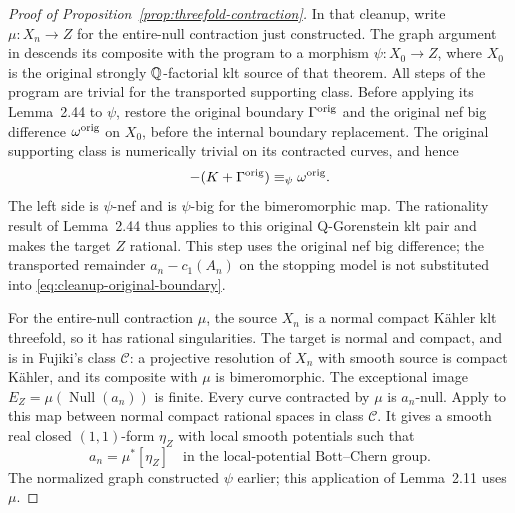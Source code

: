 \begin{proof}[Proof of Proposition~\ref{prop:threefold-contraction}]
In that cleanup, write \(\mu:X_n\to Z\) for the entire-null contraction
just constructed.  The graph argument in
\cite[proof of Theorem~6.4, pp.~51--52]{DasHacon2024} descends its
composite with the program to a morphism \(\psi:X_0\to Z\), where
\(X_0\) is the original strongly \(\mathbb Q\)-factorial klt source of that
theorem.  All steps of the program are trivial for the transported
supporting class.  Before applying its Lemma~2.44 to \(\psi\), restore
the original boundary \(\Gamma^{\rm orig}\) and the original nef big
difference \(\omega^{\rm orig}\) on \(X_0\), before the internal
boundary replacement.  The original supporting class is
numerically trivial on its contracted curves, and hence
\begin{equation}\label{eq:cleanup-original-boundary}
 -(K+\Gamma^{\rm orig})\equiv_\psi\omega^{\rm orig}.
\end{equation}
The left side is \(\psi\)-nef and is \(\psi\)-big for the bimeromorphic
map.  The rationality result of Lemma~2.44 thus applies to this original
Q-Gorenstein klt pair and makes the target \(Z\) rational.  This step
uses the original nef big difference; the transported remainder
\(a_n-c_1(A_n)\) on the stopping model is not substituted into
\eqref{eq:cleanup-original-boundary}.

For the entire-null contraction \(\mu\), the source \(X_n\) is a
normal compact K\"ahler klt
threefold, so it has rational singularities.  The target is normal and
compact, and is in Fujiki's class \(\mathcal C\): a projective resolution
of \(X_n\) with smooth source is compact K\"ahler, and its composite
with \(\mu\) is bimeromorphic.  The exceptional image
\(E_Z=\mu(\operatorname{Null}(a_n))\) is finite.  Every curve contracted
by \(\mu\) is \(a_n\)-null.  Apply
\cite[Lemma~2.11]{DasHacon2024} to this map between normal compact
rational spaces in class \(\mathcal C\).  It gives a smooth real closed
\((1,1)\)-form \(\eta_Z\) with local smooth potentials such that
\begin{equation}\label{eq:cleanup-descended-class}
 a_n=\mu^*[\eta_Z]
 \quad\text{in the local-potential Bott--Chern group.}
\end{equation}
The normalized graph constructed \(\psi\) earlier; this application of
Lemma~2.11 uses \(\mu\).


\end{proof}
